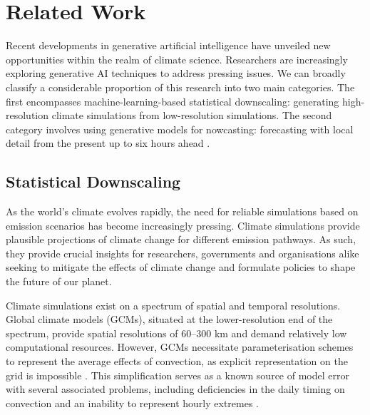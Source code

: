 \documentclass[ oneside,%
                    author={George Herbert},
                    degree={MSci},
                     title={Diffusion Models for Time-Evolving Precipitation Fields},
                  subtitle={}]{dissertation}
\begin{document}
\chapter{Related Work}
\label{chap:background_climate}

Recent developments in generative artificial intelligence have unveiled new opportunities within the realm of climate science. Researchers are increasingly exploring generative AI techniques to address pressing issues. We can broadly classify a considerable proportion of this research into two main categories. The first encompasses machine-learning-based statistical downscaling: generating high-resolution climate simulations from low-resolution simulations. The second category involves using generative models for nowcasting: forecasting with local detail from the present up to six hours ahead \cite{WMO_Guidelines_Nowcasting}.

\section{Statistical Downscaling}
\label{sec:background_climate_downscaling}

As the world's climate evolves rapidly, the need for reliable simulations based on emission scenarios has become increasingly pressing. Climate simulations provide plausible projections of climate change for different emission pathways. As such, they provide crucial insights for researchers, governments and organisations alike seeking to mitigate the effects of climate change and formulate policies to shape the future of our planet. 

Climate simulations exist on a spectrum of spatial and temporal resolutions. Global climate models (GCMs), situated at the lower-resolution end of the spectrum, provide spatial resolutions of 60--300 km and demand relatively low computational resources. However, GCMs necessitate parameterisation schemes to represent the average effects of convection, as explicit representation on the grid is impossible \cite{MO_CPM}. This simplification serves as a known source of model error with several associated problems, including deficiencies in the daily timing on convection and an inability to represent hourly extremes \cite{Hanel_Hourly_Precipitation_Extremes, Gregersen_Assessing_Future_Climatic_Changes}.
\end{document}
